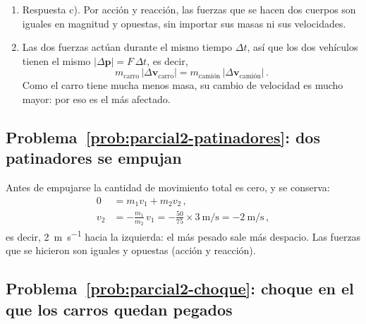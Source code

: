 \begin{enumerate}[label=(\Roman*)]
    \item Respuesta c). Por acción y reacción, las fuerzas que se hacen dos
    cuerpos son iguales en magnitud y opuestas, sin importar sus masas ni sus
    velocidades.
    \item Las dos fuerzas actúan durante el mismo tiempo $\Delta t$, así que
    los dos vehículos tienen el mismo
    $\lvert\Delta\boldsymbol{p}\rvert = F\,\Delta t$, es decir,
    \begin{equation}
        m_{\text{carro}}\,\lvert\Delta\boldsymbol{v}_{\text{carro}}\rvert
        = m_{\text{camión}}\,\lvert\Delta\boldsymbol{v}_{\text{camión}}\rvert\,.
    \end{equation}
    Como el carro tiene mucha menos masa, su cambio de velocidad es mucho
    mayor: por eso es el más afectado.
\end{enumerate}

\subsection*{Problema~\ref{prob:parcial2-patinadores}: dos patinadores se empujan}
\label{sol:parcial2-patinadores}

Antes de empujarse la cantidad de movimiento total es cero, y se conserva:
\begin{align}
    0 &= m_1 v_1 + m_2 v_2\,, \nonumber\\
    v_2 &= -\frac{m_1}{m_2}\,v_1 = -\frac{50}{75} \times \SI{3}{\meter\per\second}
         = \SI{-2}{\meter\per\second}\,,
\end{align}
es decir, \SI{2}{\meter\per\second} hacia la izquierda: el más pesado sale más
despacio. Las fuerzas que se hicieron son iguales y opuestas (acción y
reacción).

\subsection*{Problema~\ref{prob:parcial2-choque}: choque en el que los carros quedan pegados}
\label{sol:parcial2-choque}

